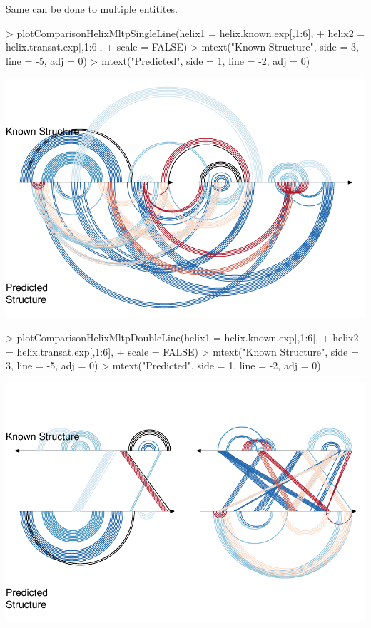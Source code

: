 \documentclass[letterpaper]{article}
\begin{document}
Same can be done to multiple entitites.

\begin{Schunk}
\begin{Sinput}
> plotComparisonHelixMltpSingleLine(helix1 = helix.known.exp[,1:6],
+                                   helix2 = helix.transat.exp[,1:6],
+                                   scale = FALSE)
> mtext("Known Structure", side = 3, line = -5, adj = 0)
> mtext("Predicted\nStructure", side = 1, line = -2, adj = 0)
\end{Sinput}
\end{Schunk}
\includegraphics{R4RNA-014}

\begin{Schunk}
\begin{Sinput}
> plotComparisonHelixMltpDoubleLine(helix1 = helix.known.exp[,1:6],
+                                   helix2 = helix.transat.exp[,1:6],
+                                   scale = FALSE)
> mtext("Known Structure", side = 3, line = -5, adj = 0)
> mtext("Predicted\nStructure", side = 1, line = -2, adj = 0)
\end{Sinput}
\end{Schunk}
\includegraphics{R4RNA-015}
\end{document}
